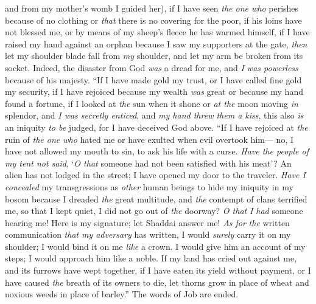 \begin{biblechapter}
and from my mother’s womb I guided her),
\verse if I have seen \textit{the one who} perishes because of no clothing 
or \textit{that} there is no covering for the poor,
\verse if his loins have not blessed me, 
or by means of my sheep’s fleece he has warmed himself,
\verse if I have raised my hand against an orphan 
because I saw my supporters at the gate,
\verse \textit{then} let my shoulder blade fall from \textit{my} shoulder, 
and let my arm be broken from its socket.
\verse Indeed, the disaster from God \textit{was} a dread for me, 
and \textit{I was powerless} because of his majesty.
\verse “If I have made gold my trust, 
or I have called fine gold my security,
\verse if I have rejoiced because my wealth \textit{was} great 
or because my hand found a fortune,
\verse if I looked at \textit{the} sun when it shone 
or \textit{at the} moon moving \textit{in} splendor,
\verse and \textit{I was secretly enticed}, 
and \textit{my hand threw them a kiss},
\verse this also \textit{is} an iniquity \textit{to be} judged, 
for I have deceived God above.
\verse “If I have rejoiced at \textit{the} ruin of \textit{the one who} hated me 
or have exulted when evil overtook him—
\verse no, I have not allowed my mouth to sin, 
to ask his life with a curse.
\verse \textit{Have the people of my tent not said}, 
‘\textit{O that} someone had not been satisfied with his meat’?
\verse An alien has not lodged in the street; 
I have opened my door to the traveler.
\verse \textit{Have I concealed} my transgressions as \textit{other} human beings 
to hide my iniquity in my bosom
\verse because I dreaded \textit{the} great multitude, 
and \textit{the} contempt of clans terrified me, 
so that I kept quiet, I did not go out of \textit{the} doorway?
\verse \textit{O that} \textit{I had} someone hearing me! 
Here is my signature; 
let Shaddai answer me! 
\textit{As for} \textit{the} written communication \textit{that} \textit{my adversary} has written,
\verse I would \textit{surely} carry it on my shoulder; 
I would bind it on me \textit{like} a crown.
\verse I would give him an account of my steps; 
I would approach him like a noble.
\verse If my land has cried out against me, 
and its furrows have wept together,
\verse if I have eaten its yield without payment, 
or I have caused \textit{the} breath of its owners to die,
\verse let thorns grow in place of wheat 
and noxious weeds in place of barley.” 
The words of Job are ended.
\end{biblechapter}

